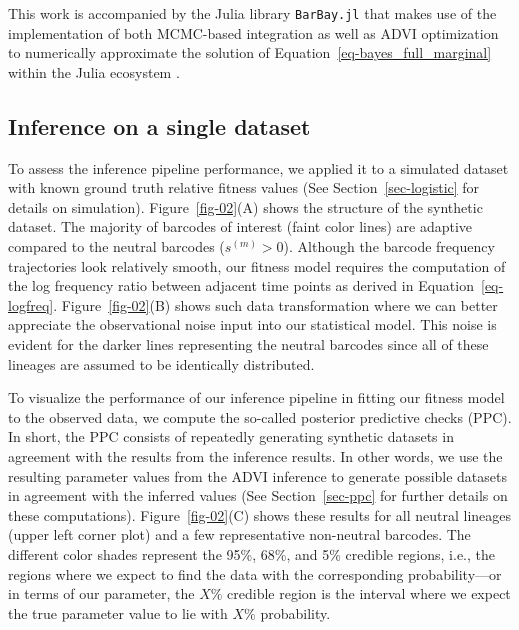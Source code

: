 \documentclass[
]{scrartcl}
\begin{document}
\begin{refsegment}
This work is accompanied by the Julia library \texttt{BarBay.jl} that
makes use of the implementation of both MCMC-based integration as well
as ADVI optimization to numerically approximate the solution of
Equation~\ref{eq-bayes_full_marginal} within the Julia ecosystem
\autocite{ge2018}.

\hypertarget{inference-on-a-single-dataset}{%
\subsection{Inference on a single
dataset}\label{inference-on-a-single-dataset}}

To assess the inference pipeline performance, we applied it to a
simulated dataset with known ground truth relative fitness values (See
Section~\ref{sec-logistic} for details on simulation).
Figure~\ref{fig-02}(A) shows the structure of the synthetic dataset. The
majority of barcodes of interest (faint color lines) are adaptive
compared to the neutral barcodes (\(s^{(m)} > 0\)). Although the barcode
frequency trajectories look relatively smooth, our fitness model
requires the computation of the log frequency ratio between adjacent
time points as derived in Equation~\ref{eq-logfreq}.
Figure~\ref{fig-02}(B) shows such data transformation where we can
better appreciate the observational noise input into our statistical
model. This noise is evident for the darker lines representing the
neutral barcodes since all of these lineages are assumed to be
identically distributed.

To visualize the performance of our inference pipeline in fitting our
fitness model to the observed data, we compute the so-called posterior
predictive checks (PPC). In short, the PPC consists of repeatedly
generating synthetic datasets in agreement with the results from the
inference results. In other words, we use the resulting parameter values
from the ADVI inference to generate possible datasets in agreement with
the inferred values (See Section~\ref{sec-ppc} for further details on
these computations). Figure~\ref{fig-02}(C) shows these results for all
neutral lineages (upper left corner plot) and a few representative
non-neutral barcodes. The different color shades represent the 95\%,
68\%, and 5\% credible regions, i.e., the regions where we expect to
find the data with the corresponding probability---or in terms of our
parameter, the \(X\%\) credible region is the interval where we expect
the true parameter value to lie with \(X\%\) probability.


\end{refsegment}
\end{document}
